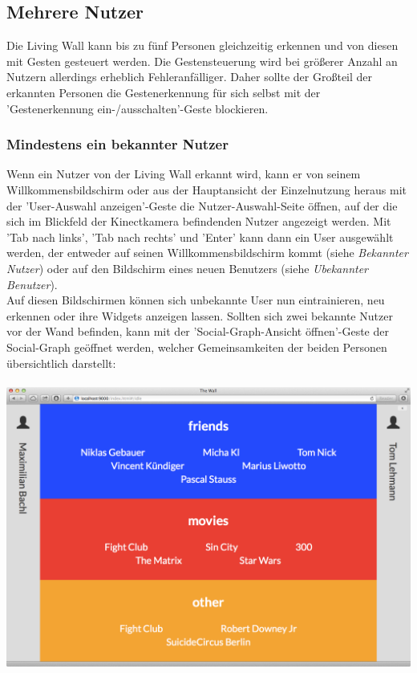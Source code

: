 \documentclass[10pt,a4paper]{report}
\begin{document}
		\subsection{Mehrere Nutzer}
		Die Living Wall kann bis zu fünf Personen gleichzeitig erkennen und von diesen mit Gesten gesteuert werden. Die Gestensteuerung wird bei größerer Anzahl an Nutzern allerdings erheblich Fehleranfälliger. Daher sollte der Großteil der erkannten Personen die Gestenerkennung für sich selbst mit der 'Gestenerkennung ein-/ausschalten'-Geste blockieren.
		\subsubsection{Mindestens ein bekannter Nutzer}
		Wenn ein Nutzer von der Living Wall erkannt wird, kann er von seinem Willkommensbildschirm oder aus der Hauptansicht der Einzelnutzung heraus mit der 'User-Auswahl anzeigen'-Geste die Nutzer-Auswahl-Seite öffnen, auf der die sich im Blickfeld der Kinectkamera befindenden Nutzer angezeigt werden. Mit 'Tab nach links', 'Tab nach rechts' und 'Enter' kann dann ein User ausgewählt werden, der entweder auf seinen Willkommensbildschirm kommt (siehe \textit{Bekannter Nutzer}) oder auf den Bildschirm eines neuen Benutzers (siehe \textit{Ubekannter Benutzer}).\\
		Auf diesen Bildschirmen können sich unbekannte User nun eintrainieren, neu erkennen oder ihre Widgets anzeigen lassen.
		Sollten sich zwei bekannte Nutzer vor der Wand befinden, kann mit der 'Social-Graph-Ansicht öffnen'-Geste der Social-Graph geöffnet werden, welcher Gemeinsamkeiten der beiden Personen übersichtlich darstellt:\\\\
		\includegraphics[width=\linewidth]{socialgraph}\\\\
\end{document}

